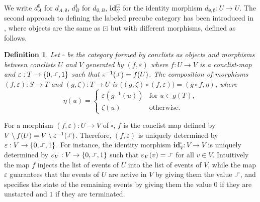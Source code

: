 \documentclass[11pt,a4paper,oldfontcommands]{memoir}
\newcommand*\exec{%
  \raisebox{1pt}{%
    \begin{tikzpicture}[x=.8ex,y=1ex,-]
      \draw (0,0) -- (1,0) -- (1,1) -- (2,1);
    \end{tikzpicture}}}
\newtheorem{definition}{Definition}
\begin{document}
We write $d_{A}^{0}$ for $d_{A, \emptyset}$, $d_{B}^{1}$ for $d_{\emptyset, B}$, $\mathbf{id}^{\boxdot}_{U}$ for the identity morphism $d_{\emptyset, \emptyset}: U \rightarrow U$.
The second approach to defining the labeled precube category has been introduced in \cite{LanguageofHDA}, where objects are the same as $\boxdot$ but with different morphisms, defined as follows.
\begin{definition}\label{def: precube} 
Let $\square$ be the category formed by conclists as objects and morphisms between conclists $U$ and $V$ generated by $(f,\varepsilon)$ where $f: U \rightarrow V$ is a conclist-map and $\varepsilon: T\rightarrow \{ 0,\exec, 1 \}$ such that $\varepsilon^{-1}(\exec)= f(U)$. The composition of morphisms $(f,\varepsilon):S\to T$ and
    $(g,\zeta):T\to U$ is $\bigl((g,\zeta) \circ (f,\varepsilon)  \bigl)=(g\circ f,\eta)$, where
    \begin{equation*}
      \eta(u)=
      \begin{cases}
        \varepsilon(g^{-1}(u)) & \text{for $u\in g(T)$}, \\
        \zeta(u) & \text{otherwise}.
      \end{cases}
    \end{equation*}
\end{definition}
For a morphism $(f, \varepsilon): U \rightarrow V$ of $\square$, $f$ is the conclist map defined by \linebreak $V \setminus f(U)= V \setminus \varepsilon^{-1}(\exec)$. Therefore, $(f, \varepsilon)$ is uniquely determined by $\varepsilon: V \rightarrow \{ 0, \exec, 1\}$. For instance, the identity morphism $\mathbf{id}^{\square}_{V}: V \rightarrow V$ is uniquely determined by $\varepsilon_V: V \rightarrow \{ 0, \exec, 1\}$ such that $\varepsilon_V (v)=\exec$ for all $v\in V.$ Intuitively the map $f$ injects the list of events of $U$  into the list of events of $V$, while the map $\varepsilon$ guarantees that the events of $U$ are active in $V$ by giving them the value $\exec$, and specifies the state of the remaining events by giving them the value $0$ if they are unstarted and $1$ if they are terminated. 
\end{document}
